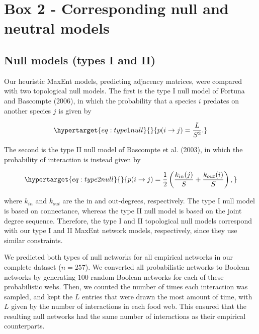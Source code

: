 \documentclass[10pt,oneside]{article}
\begin{document}
\hypertarget{box-2---corresponding-null-and-neutral-models}{%
\section{Box 2 - Corresponding null and neutral
models}\label{box-2---corresponding-null-and-neutral-models}}

\hypertarget{null-models-types-i-and-ii}{%
\subsection{Null models (types I and
II)}\label{null-models-types-i-and-ii}}

Our heuristic MaxEnt models, predicting adjacency matrices, were
compared with two topological null models. The first is the type I null
model of Fortuna and Bascompte (2006), in which the probability that a
species \(i\) predates on another species \(j\) is given by

\begin{equation}\protect\hypertarget{eq:type1null}{}{p(i \rightarrow j) = \frac{L}{S^2}.}\label{eq:type1null}\end{equation}

The second is the type II null model of Bascompte et al. (2003), in
which the probability of interaction is instead given by

\begin{equation}\protect\hypertarget{eq:type2null}{}{p(i \rightarrow j) = \frac{1}{2} \left(\frac{k_{in}(j)}{S} + \frac{k_{out}(i)}{S}\right),}\label{eq:type2null}\end{equation}

where \(k_{in}\) and \(k_{out}\) are the in and out-degrees,
respectively. The type I null model is based on connectance, whereas the
type II null model is based on the joint degree sequence. Therefore, the
type I and II topological null models correspond with our type I and II
MaxEnt network models, respectively, since they use similar constraints.

We predicted both types of null networks for all empirical networks in
our complete dataset (\(n = 257\)). We converted all probabilistic
networks to Boolean networks by generating \(100\) random Boolean
networks for each of these probabilistic webs. Then, we counted the
number of times each interaction was sampled, and kept the \(L\) entries
that were drawn the most amount of time, with \(L\) given by the number
of interactions in each food web. This ensured that the resulting null
networks had the same number of interactions as their empirical
counterparts.
\end{document}
